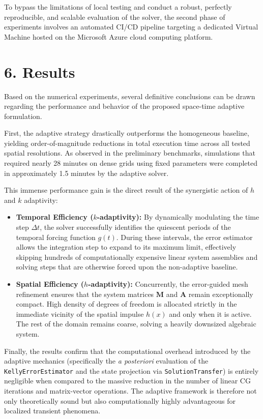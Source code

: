 \documentclass[
  11pt,
]{article}
\begin{document}
To bypass the limitations of local testing and conduct a robust, perfectly reproducible, and scalable evaluation of the solver, the second phase of experiments involves an automated CI/CD pipeline targeting a dedicated Virtual Machine hosted on the Microsoft Azure cloud computing platform.


\section{6. Results}

Based on the numerical experiments, several definitive conclusions can be drawn regarding the performance and behavior of the proposed space-time adaptive formulation.

First, the adaptive strategy drastically outperforms the homogeneous baseline, yielding order-of-magnitude reductions in total execution time across all tested spatial resolutions. As observed in the preliminary benchmarks, simulations that required nearly 28 minutes on dense grids using fixed parameters were completed in approximately 1.5 minutes by the adaptive solver.

This immense performance gain is the direct result of the synergistic action of $h$ and $k$ adaptivity:
\begin{itemize}
    \item \textbf{Temporal Efficiency ($k$-adaptivity):} By dynamically modulating the time step $\Delta t$, the solver successfully identifies the quiescent periods of the temporal forcing function $g(t)$. During these intervals, the error estimator allows the integration step to expand to its maximum limit, effectively skipping hundreds of computationally expensive linear system assemblies and solving steps that are otherwise forced upon the non-adaptive baseline.
    \item \textbf{Spatial Efficiency ($h$-adaptivity):} Concurrently, the error-guided mesh refinement ensures that the system matrices $\mathbf{M}$ and $\mathbf{A}$ remain exceptionally compact. High density of degrees of freedom is allocated strictly in the immediate vicinity of the spatial impulse $h(x)$ and only when it is active. The rest of the domain remains coarse, solving a heavily downsized algebraic system.
\end{itemize}

Finally, the results confirm that the computational overhead introduced by the adaptive mechanics (specifically the \textit{a posteriori} evaluation of the \texttt{KellyErrorEstimator} and the state projection via \texttt{SolutionTransfer}) is entirely negligible when compared to the massive reduction in the number of linear CG iterations and matrix-vector operations. The adaptive framework is therefore not only theoretically sound but also computationally highly advantageous for localized transient phenomena.
\end{document}
